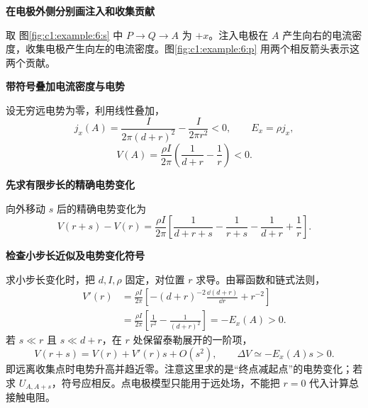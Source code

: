 \begin{solution}\textbf{在电极外侧分别画注入和收集贡献}\par\nobreak
取 图\ref{fig:c1:example:6:s} 中 $P\to Q\to A$ 为 $+x$。注入电极在 $A$ 产生向右的电流密度，收集电极产生向左的电流密度。图\ref{fig:c1:example:6:p} 用两个相反箭头表示这两个贡献。



\par\medskip{}\noindent\textbf{带符号叠加电流密度与电势}\par\nobreak
设无穷远电势为零，利用线性叠加，
\[
 j_x(A)=\frac{I}{2\pi(d+r)^2}-\frac{I}{2\pi r^2}<0,\qquad E_x=\rho j_x,
\]
\[
 V(A)=\frac{\rho I}{2\pi}\left(\frac1{d+r}-\frac1r\right)<0.
\]


\par\medskip{}\noindent\textbf{先求有限步长的精确电势变化}\par\nobreak
向外移动 $s$ 后的精确电势变化为
\[
 V(r+s)-V(r)=\frac{\rho I}{2\pi}
 \left[\frac1{d+r+s}-\frac1{r+s}-\frac1{d+r}+\frac1r\right].
\]


\par\medskip{}\noindent\textbf{检查小步长近似及电势变化符号}\par\nobreak
求小步长变化时，把 $d,I,\rho$ 固定，对位置 $r$ 求导。由幂函数和链式法则，
\[
 \begin{aligned}
 V'(r)&=\frac{\rho I}{2\pi}
 \left[-(d+r)^{-2}\frac{\dd(d+r)}{\dd r}+r^{-2}\right]\\
 &=\frac{\rho I}{2\pi}\left[\frac1{r^2}-\frac1{(d+r)^2}\right]
 =-E_x(A)>0.
 \end{aligned}
\]
若 $s\ll r$ 且 $s\ll d+r$，在 $r$ 处保留泰勒展开的一阶项，
\[
 V(r+s)=V(r)+V'(r)s+O(s^2),\qquad
 \Delta V\simeq-E_x(A)s>0.
\]
即远离收集点时电势升高并趋近零。注意这里求的是“终点减起点”的电势变化；若求 $U_{A,A+s}$，符号应相反。点电极模型只能用于远处场，不能把 $r=0$ 代入计算总接触电阻。\end{solution}
